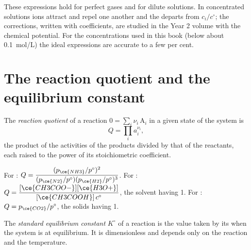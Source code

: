 \begin{remark}\label{rem:b1:extent-q-and-k:ideal}
These expressions hold for perfect gases and for dilute solutions. In
concentrated solutions ions attract and repel one another and the
 departs from $c_i/c^\circ$; the corrections, written with
 coefficients, are studied in the Year 2 volume with the chemical
potential. For the concentrations used in this book (below about
\qty{0.1}{mol/L}) the ideal expressions are accurate to a few per cent.
\end{remark}

\section{The reaction quotient and the equilibrium constant}

\begin{definition}\label{def:b1:extent-q-and-k:quotient}
The \emph{reaction quotient} of a reaction
$0 = \sum_i \nu_i\,\mathrm{A}_i$ in a given state of the system is
\[
  Q = \prod_i a_i^{\nu_i} ,
\]
the product of the activities of the products divided by that of the
reactants, each raised to the power of its stoichiometric coefficient.
\end{definition}

\begin{example}\label{ex:b1:extent-q-and-k:quotients}
For : $Q = \dfrac{(p_{\ce{NH3}}/p^\circ)^2}
{(p_{\ce{N2}}/p^\circ)(p_{\ce{H2}}/p^\circ)^3}$. For
: $Q =
\dfrac{[\ce{CH3COO-}][\ce{H3O+}]}{[\ce{CH3COOH}]\,c^\circ}$, the solvent
having  1. For : $Q =
p_{\ce{CO2}}/p^\circ$, the solids having  1.
\end{example}

\begin{definition}\label{def:b1:extent-q-and-k:equilibrium-constant}
The \emph{standard equilibrium constant} $K^\circ$ of a reaction is the value taken by its  when the system is at equilibrium. It is dimensionless and
depends only on the reaction and the temperature.
\end{definition}

